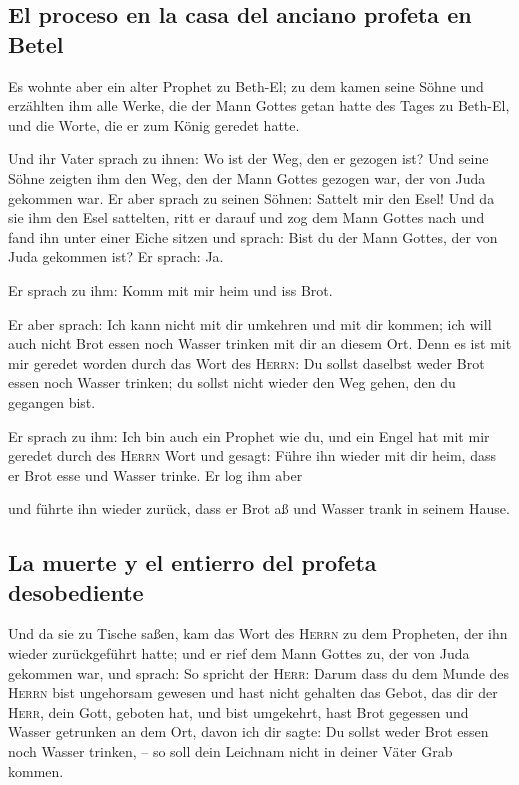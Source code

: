 \hypertarget{el-proceso-en-la-casa-del-anciano-profeta-en-betel}{%
\subsection{El proceso en la casa del anciano profeta en
Betel}\label{el-proceso-en-la-casa-del-anciano-profeta-en-betel}}

 Es wohnte aber ein alter Prophet zu Beth-El; zu dem
kamen seine Söhne und erzählten ihm alle Werke, die der Mann Gottes
getan hatte des Tages zu Beth-El, und die Worte, die er zum König
geredet hatte.

 Und ihr Vater sprach zu ihnen: Wo ist der Weg, den er
gezogen ist? Und seine Söhne zeigten ihm den Weg, den der Mann Gottes
gezogen war, der von Juda gekommen war.  Er aber sprach
zu seinen Söhnen: Sattelt mir den Esel! Und da sie ihm den Esel
sattelten, ritt er darauf  und zog dem Mann Gottes nach
und fand ihn unter einer Eiche sitzen und sprach: Bist du der Mann
Gottes, der von Juda gekommen ist? Er sprach: Ja.

 Er sprach zu ihm: Komm mit mir heim und iss Brot.

 Er aber sprach: Ich kann nicht mit dir umkehren und mit
dir kommen; ich will auch nicht Brot essen noch Wasser trinken mit dir
an diesem Ort.  Denn es ist mit mir geredet worden durch
das Wort des \textsc{Herrn}: Du sollst daselbst weder Brot essen noch
Wasser trinken; du sollst nicht wieder den Weg gehen, den du gegangen
bist.

 Er sprach zu ihm: Ich bin auch ein Prophet wie du, und
ein Engel hat mit mir geredet durch des \textsc{Herrn} Wort und gesagt:
Führe ihn wieder mit dir heim, dass er Brot esse und Wasser trinke. Er
log ihm aber

 und führte ihn wieder zurück, dass er Brot aß und Wasser
trank in seinem Hause.

\hypertarget{la-muerte-y-el-entierro-del-profeta-desobediente}{%
\subsection{La muerte y el entierro del profeta
desobediente}\label{la-muerte-y-el-entierro-del-profeta-desobediente}}

 Und da sie zu Tische saßen, kam das Wort des
\textsc{Herrn} zu dem Propheten, der ihn wieder zurückgeführt hatte;
 und er rief dem Mann Gottes zu, der von Juda gekommen
war, und sprach: So spricht der \textsc{Herr}: Darum dass du dem Munde
des \textsc{Herrn} bist ungehorsam gewesen und hast nicht gehalten das
Gebot, das dir der \textsc{Herr}, dein Gott, geboten hat,
 und bist umgekehrt, hast Brot gegessen und Wasser
getrunken an dem Ort, davon ich dir sagte: Du sollst weder Brot essen
noch Wasser trinken, -- so soll dein Leichnam nicht in deiner Väter Grab
kommen.

